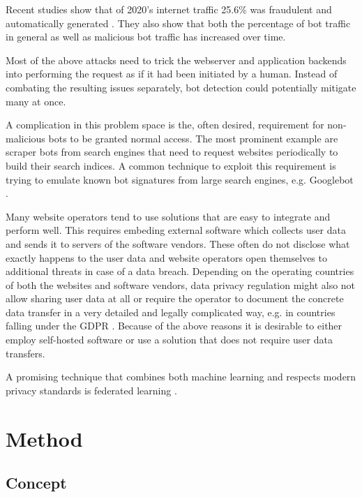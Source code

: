 \documentclass[
    fontsize=12pt,
    headings=small,
    parskip=half,           %
    bibliography=totoc,
    numbers=noenddot,       %
    open=any,               %
    final                   %
    ]{scrreprt}
\begin{document}
Recent studies show that of 2020's internet traffic 25.6\% was fraudulent and automatically generated \cite{BAD_BOT_REPORT2020} \cite{BAD_BOT_REPORT2021}. They also show that both the percentage of bot traffic in general as well as malicious bot traffic has increased over time.

Most of the above attacks need to trick the webserver and application backends into performing the request as if it had been initiated by a human. Instead of combating the resulting issues separately, bot detection could potentially mitigate many at once.

A complication in this problem space is the, often desired, requirement for non-malicious bots to be granted normal access. The most prominent example are scraper bots from search engines that need to request websites periodically to build their search indices. A common technique to exploit this requirement is trying to emulate known bot signatures from large search engines, e.g. Googlebot \cite{8421894}.

Many website operators tend to use solutions that are easy to integrate and perform well. This requires embeding external software which collects user data and sends it to servers of the software vendors. These often do not disclose what exactly happens to the user data and website operators open themselves to additional threats in case of a data breach. Depending on the operating countries of both the websites and software vendors, data privacy regulation might also not allow sharing user data at all or require the operator to document the concrete data transfer in a very detailed and legally complicated way, e.g. in countries falling under the GDPR \cite{GDPR}. Because of the above reasons it is desirable to either employ self-hosted software or use a solution that does not require user data transfers.


A promising technique that combines both machine learning and respects modern privacy standards is federated learning \cite{DBLP:journals/corr/KonecnyMR15} \cite{DBLP:journals/corr/KonecnyMRR16}.

\chapter{Method}

\section{Concept}
\end{document}
